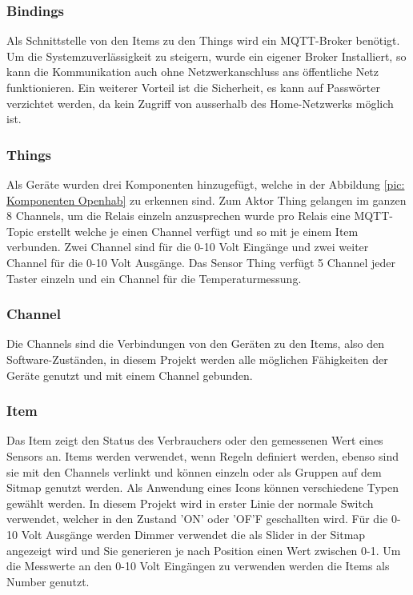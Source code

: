 \subsubsection{Bindings}
Als Schnittstelle von den Items zu den Things wird ein MQTT-Broker benötigt. Um die Systemzuverlässigkeit zu steigern, wurde ein eigener Broker Installiert, so kann die Kommunikation auch ohne Netzwerkanschluss ans öffentliche Netz funktionieren. Ein weiterer Vorteil ist die Sicherheit, es kann auf Passwörter verzichtet werden, da kein Zugriff von ausserhalb des Home-Netzwerks möglich ist.

\subsubsection{Things}
 Als Geräte wurden drei Komponenten hinzugefügt, welche in der Abbildung \ref{pic: Komponenten Openhab} zu erkennen sind. Zum Aktor Thing gelangen im ganzen 8 Channels, um die Relais einzeln anzusprechen wurde pro Relais eine MQTT-Topic erstellt welche je einen Channel verfügt und so mit je einem Item verbunden. Zwei Channel sind für die 0-10 Volt Eingänge und zwei weiter Channel für die 0-10 Volt Ausgänge. Das Sensor Thing verfügt 5 Channel jeder Taster einzeln und ein Channel für die Temperaturmessung.

\subsubsection{Channel}
Die Channels sind die Verbindungen von den Geräten zu den Items, also den Software-Zuständen, in diesem Projekt werden alle möglichen Fähigkeiten der Geräte genutzt und mit einem Channel gebunden.

\subsubsection{Item}
Das Item zeigt den Status des Verbrauchers oder den gemessenen Wert eines Sensors an. Items werden verwendet, wenn Regeln definiert werden, ebenso sind sie mit den Channels verlinkt und können einzeln oder als Gruppen auf dem Sitmap genutzt werden. Als Anwendung eines Icons können verschiedene Typen gewählt werden. In diesem Projekt wird in erster Linie der normale Switch verwendet, welcher in den Zustand 'ON' oder 'OF'F geschallten wird. Für die 0-10 Volt Ausgänge werden Dimmer verwendet die als Slider in der Sitmap angezeigt wird und Sie generieren je nach Position einen Wert zwischen 0-1. Um die Messwerte an den 0-10 Volt Eingängen zu verwenden werden die Items als Number genutzt.

